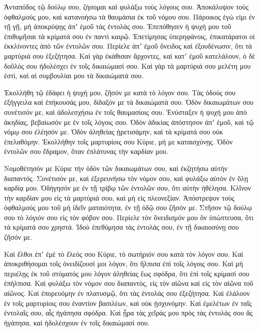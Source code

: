 \begin{spacing}{1.1}
\begin{multicols}{2}
Ἀνταπόδος τῷ δούλῳ σου, ζήσομαι καὶ φυλάξω τοὺς λόγους σου.
Ἀποκάλυψον τοὺς ὀφθαλμούς μου, καὶ κατανοήσω τὰ θαυμάσια ἐκ τοῦ νόμου σου.
Πάροικος ἐγώ εἰμι ἐν τῇ γῇ, μὴ ἀποκρύψῃς ἀπʼ ἐμοῦ τὰς ἐντολάς σου.
Ἐπεπόθησεν ἡ ψυχή μου τοῦ ἐπιθυμῆσαι τὰ κρίματά σου ἐν παντὶ καιρῷ.
Ἐπετίμησας ὑπερηφάνοις, ἐπικατάρατοι οἱ ἐκκλίνοντες ἀπὸ τῶν ἐντολῶν σου.
Περίελε ἀπʼ ἐμοῦ ὄνειδος καὶ ἐξουδένωσιν, ὅτι τὰ μαρτύριά σου ἐξεζήτησα.
Καὶ γὰρ ἐκάθισαν ἄρχοντες, καὶ κατʼ ἐμοῦ κατελάλουν, ὁ δὲ δοῦλός σου ἠδολέσχει ἐν τοῖς δικαιώμασί σου.
Καὶ γὰρ τὰ μαρτύριά σου μελέτη μου ἐστὶ, καὶ αἱ συμβουλίαι μου τὰ δικαιώματά σου.

Ἐκολλήθη τῷ ἐδάφει ἡ ψυχή μου, ζῆσόν με κατὰ τὸ λόγον σου.
Τὰς ὁδούς σου ἐξήγγειλα καὶ ἐπήκουσάς μου, δίδαξόν με τὰ δικαιώματά σου.
Ὁδὸν δικαιωμάτων σου συνέτισόν με, καὶ ἀδολεσχήσω ἐν τοῖς θαυμασίοις σου.
Ἐνύσταξεν ἡ ψυχή μου ἀπὸ ἀκηδίας, βεβαίωσόν με ἐν τοῖς λόγοις σου.
Ὁδὸν ἀδικίας ἀπόστησον ἀπʼ ἐμοῦ, καὶ τῷ νόμῳ σου ἐλέησόν με.
Ὁδὸν ἀληθείας ᾑρετισάμην, καὶ τὰ κρίματά σου οὐκ ἐπελαθόμην.
Ἐκολλήθην τοῖς μαρτυρίοις σου Κύριε, μή με καταισχύνῃς.
Ὁδὸν ἐντολῶν σου ἔδραμον, ὅταν ἐπλάτυνας τὴν καρδίαν μου.

Νομοθέτησόν με Κύριε τὴν ὁδὸν τῶν δικαιωμάτων σου, καὶ ἐκζητήσω αὐτὴν διαπαντός.
Συνέτισόν με, καὶ ἐξερευνήσω τὸν νόμον σου, καὶ φυλάξω αὐτὸν ἐν ὅλῃ καρδίᾳ μου.
Ὁδήγησόν με ἐν τῇ τρίβῳ τῶν ἐντολῶν σου, ὅτι αὐτὴν ἠθέλησα.
Κλῖνον τὴν καρδίαν μου εἰς τὰ μαρτύριά σου, καὶ μὴ εἰς πλεονεξίαν.
Ἀπόστρεψον τοὺς ὀφθαλμούς μου τοῦ μὴ ἰδεῖν ματαιότητα, ἐν τῇ ὁδῷ σου ζῆσόν με.
Στῆσον τῷ δούλῳ σου τὸ λόγιόν σου εἰς τὸν φόβον σου.
Περίελε τὸν ὄνειδισμόν μου ὃν ὑπώπτευσα, ὅτι τὰ κρίματά σου χρηστά.
Ἰδοὺ ἐπεθύμησα τὰς ἐντολάς σου, ἐν τῇ δικαιοσύνῃ σου ζῆσόν με.

Καὶ ἔλθοι ἐπʼ ἐμὲ τὸ ἔλεός σου Κύριε, τὸ σωτήριόν σου κατὰ τὸν λόγον σου.
Καὶ ἀποκριθήσομαι τοῖς ὀνειδίζουσί μοι λόγον, ὅτι ἤλπισα ἐπὶ τοῖς λόγοις σου.
Καὶ μὴ περιέλῃς ἐκ τοῦ στόματός μου λόγον ἀληθείας ἕως σφόδρα, ὅτι ἐπὶ τοῖς κρίμασί σου ἐπήλπισα.
Καὶ φυλάξω τὸν νόμον σου διαπαντὸς, εἰς τὸν αἰῶνα καὶ εἰς τὸν αἰῶνα τοῦ αἰῶνος.
Καὶ ἐπορευόμην ἐν πλατυσμῷ, ὅτι τὰς ἐντολάς σου ἐξεζήτησα.
Καὶ ἐλάλουν ἐν τοῖς μαρτυρίοις σου ἐναντίον βασιλέων, καὶ οὐκ ᾐσχυνόμην.
Καὶ ἐμελέτων ἐν ταῖς ἐντολαῖς σου, αἷς ἠγάπησα σφόδρα.
Καὶ ᾖρα τὰς χεῖράς μου πρὸς τὰς ἐντολάς σου ἃς ἠγάπησα, καὶ ἠδολέσχουν ἐν τοῖς δικαιώμασί σου.


\end{multicols}
\end{spacing}
